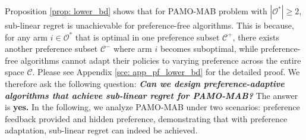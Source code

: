 Proposition \ref{prop: lower_bd} shows that for PAMO-MAB problem with $|\mathcal{O}^*| \geq 2$, sub-linear regret is unachievable for preference-free algorithms.
This is because, for any arm $i \in \mathcal{O}^*$ that is optimal in one preference subset $\mathcal{C}^{+}$, there exists another preference subset $\mathcal{C}^{-}$ where arm $i$ becomes suboptimal,
while preference-free algorithms cannot adapt their policies to varying preference across the entire space $\mathcal{C}$. 
Please see Appendix \ref{sce: app_pf_lower_bd} for the  detailed proof. 
We therefore ask the following question:
\textbf{\emph{Can we design preference-adaptive algorithms that achieve sub-linear regret for PAMO-MAB?}}
The answer is {\bf yes.}
In the following, we analyze PAMO-MAB under two scenarios: preference feedback provided and hidden preference, demonstrating that with preference adaptation, sub-linear regret can indeed be achieved.





